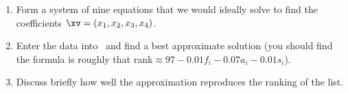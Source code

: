 \begin{exercise}
\begin{enumerate}
\item Form a system of nine equations that we would ideally solve to find the coefficients \(\xv=(x_1,x_2,x_3,x_4)\).
\setbox\ajrqrbox\hbox{}%
\marginpar{\usebox{\ajrqrbox\\[2ex]}}%
\item Enter the data into \script\ and find a best approximate solution (you should find the formula is roughly that rank\({}\approx 97-0.01f_i-0.07a_i-0.01s_i\)).
\item Discuss briefly how well the approximation reproduces the ranking of the list.
\end{enumerate}
\end{exercise}





\begin{comment}
Might be nice to show \(1/f\) structure of music, Voss \& Clark.  However, probably too data hungry, and too hard to explain the Fourier transform to the power spectrum.  
Could it be done after orthogonal diagonalisation?

Exercises involving higher-D inference.
\end{comment}





